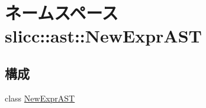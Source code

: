\hypertarget{namespaceslicc_1_1ast_1_1NewExprAST}{
\section{ネームスペース slicc::ast::NewExprAST}
\label{namespaceslicc_1_1ast_1_1NewExprAST}
}
\subsection*{構成}
\begin{DoxyCompactItemize}
\item 
class \hyperlink{classslicc_1_1ast_1_1NewExprAST_1_1NewExprAST}{NewExprAST}
\end{DoxyCompactItemize}
